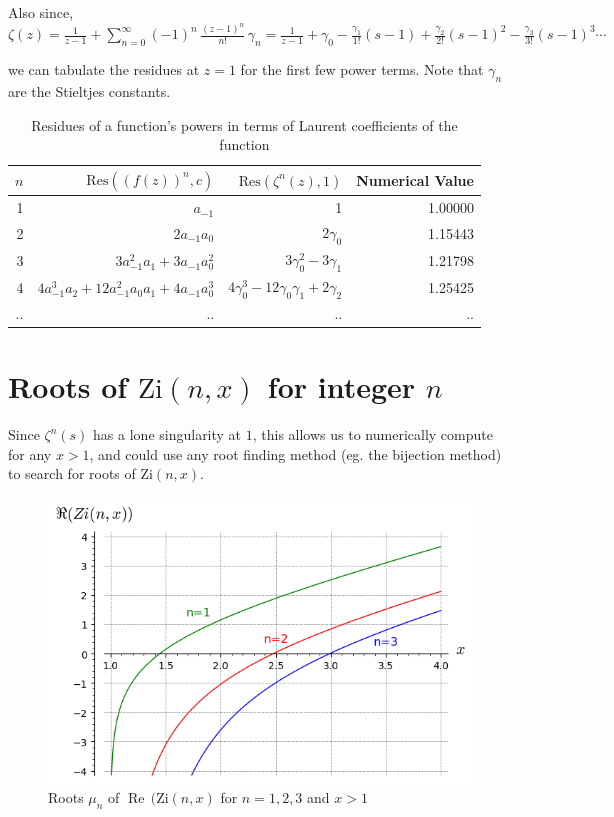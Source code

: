 \documentclass[a4paper,11pt,twoside]{amsart}
\newcommand\Zi{\mathrm{Zi}}
\newcommand\Res{\mathrm{Res}}
\renewcommand\Re{{\operatorname{Re\,}}}
\begin{document}
Also since,\\
$\zeta(z) = \frac{1}{z-1} + \sum\limits_{n=0}^{\infty} (-1)^n\,\frac{(z-1)^n}{n!}\, \gamma_n = \frac{1}{z-1} + \gamma_0 - \frac{\gamma_1}{1!}(s-1) + \frac{\gamma_2}{2!}(s-1)^2 - \frac{\gamma_3}{3!}(s-1)^3 \cdots$

we can tabulate the residues at $z=1$ for the first few power terms. Note that $\gamma_n$ are the Stieltjes constants. 

\begin{table}[H]
  \begin{center}
    \caption{Residues of a function's powers in terms of Laurent coefficients of the function}
    \label{tab:table1}
    \begin{tabular}{r|r|r|r} %
      $n$ & $\Res((f(z))^n,c)$ &  $\Res(\zeta^{n}(z),1)$ & Numerical Value\\
      \hline
      1 &  $a_{-1}$ & 1 & 1.00000\\
      2 &  $2a_{-1}a_{0}$ & $2\gamma_0$ & 1.15443\\
      3 &  $3a_{-1}^2 a_{1} + 3a_{-1} a_{0}^2$ & $3\gamma_0^2-3\gamma_1$ & 1.21798\\
      4 &  $4a_{-1}^3 a_{2} + 12a_{-1}^2 a_{0} a_{1} + 4a_{-1} a_{0}^3$ & $4\gamma_0^3-12\gamma_0\gamma_1 +2\gamma_2$ & 1.25425\\
      .. & .. & .. & ..\\
    \end{tabular}
  \end{center}
\end{table}


\section{Roots of $\Zi(n,x)$ for integer $n$}

Since $\zeta^{n}(s)$ has a lone singularity at $1$, this allows us to numerically compute for any $x>1$, and could use any root finding method (eg. the bijection method) to search for roots of $\Zi(n,x)$.

\begin{figure}[H]
  \includegraphics[width=0.8\linewidth]{RootsZinx.png}
  \caption{Roots $\mu_n$ of $\Re(\Zi(n,x)$ for $n=1,2,3$ and $x > 1$}
\end{figure}
\end{document}
